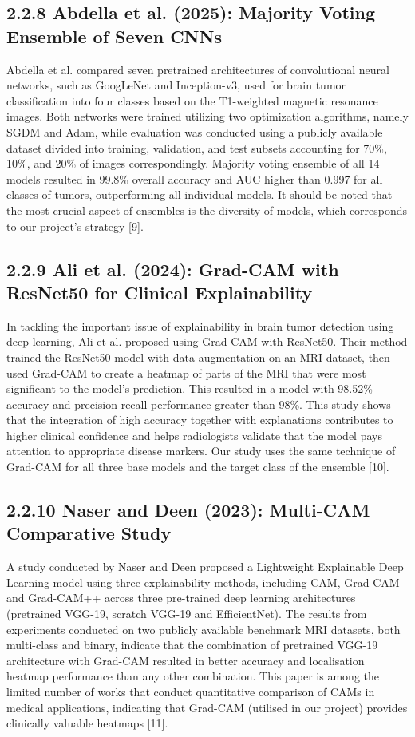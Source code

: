 \documentclass[12pt,a4paper,oneside]{report}
\begin{document}
\subsection*{2.2.8 Abdella et al. (2025): Majority Voting Ensemble of Seven CNNs}
Abdella et al. compared seven pretrained architectures of convolutional neural networks, such as GoogLeNet and Inception-v3, used for brain tumor classification into four classes based on the T1-weighted magnetic resonance images. Both networks were trained utilizing two optimization algorithms, namely SGDM and Adam, while evaluation was conducted using a publicly available dataset divided into training, validation, and test subsets accounting for 70\%, 10\%, and 20\% of images correspondingly. Majority voting ensemble of all 14 models resulted in 99.8\% overall accuracy and AUC higher than 0.997 for all classes of tumors, outperforming all individual models. It should be noted that the most crucial aspect of ensembles is the diversity of models, which corresponds to our project's strategy [9].
\subsection*{2.2.9 Ali et al. (2024): Grad-CAM with ResNet50 for Clinical Explainability}
In tackling the important issue of explainability in brain tumor detection using deep learning, Ali et al. proposed using Grad-CAM with ResNet50. Their method trained the ResNet50 model with data augmentation on an MRI dataset, then used Grad-CAM to create a heatmap of parts of the MRI that were most significant to the model's prediction. This resulted in a model with 98.52\% accuracy and precision-recall performance greater than 98\%. This study shows that the integration of high accuracy together with explanations contributes to higher clinical confidence and helps radiologists validate that the model pays attention to appropriate disease markers. Our study uses the same technique of Grad-CAM for all three base models and the target class of the ensemble [10].
\subsection*{2.2.10 Naser and Deen (2023): Multi-CAM Comparative Study}
A study conducted by Naser and Deen proposed a Lightweight Explainable Deep Learning model using three explainability methods, including CAM, Grad-CAM and Grad-CAM++ across three pre-trained deep learning architectures (pretrained VGG-19, scratch VGG-19 and EfficientNet). The results from experiments conducted on two publicly available benchmark MRI datasets, both multi-class and binary, indicate that the combination of pretrained VGG-19 architecture with Grad-CAM resulted in better accuracy and localisation heatmap performance than any other combination. This paper is among the limited number of works that conduct quantitative comparison of CAMs in medical applications, indicating that Grad-CAM (utilised in our project) provides clinically valuable heatmaps [11].
\end{document}
